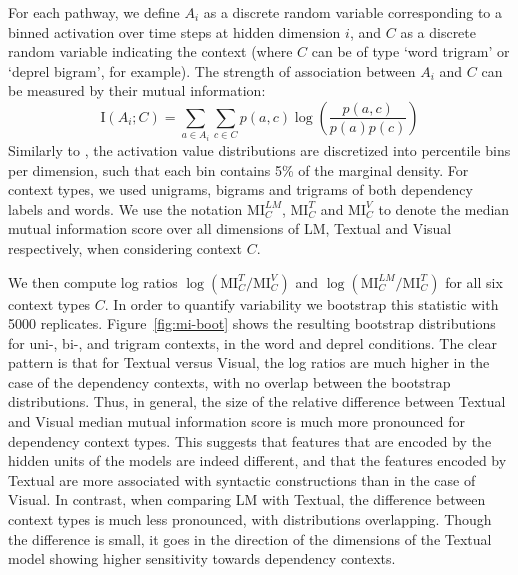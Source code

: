 For each pathway, we define $A_i$ as a discrete random variable corresponding 
to a binned activation over time steps at hidden dimension $i$, and $C$ 
as a discrete random variable indicating the context 
(where $C$ can be of type `word trigram' or `deprel bigram', for example). 
The strength of association between $A_i$ and $C$ can be measured 
by their mutual information:
\[
\mathrm{I}(A_i;C) = \sum_{a\in{A_i}}\sum_{c\in{C}} p(a,c)\log\left(\frac{p(a,c)}{p(a)p(c)}\right) 
\]
Similarly to , the activation value distributions are discretized 
into percentile bins per dimension, such that each bin contains 5\% of the marginal 
density. For context types, we used unigrams, bigrams and trigrams of both dependency labels 
and words. We use the notation $\mathrm{MI}^\mathit{LM}_C$,  $\mathrm{MI}^T_C$ and  $\mathrm{MI}^V_C$ 
to denote the median mutual information score over all dimensions of {\sc LM}, {\sc Textual} and {\sc Visual} 
respectively, when considering context $C$. 


We then compute log ratios $\log(\mathrm{MI}^{T}_{C}/\mathrm{MI}^{V}_{C})$ and $\log(\mathrm{MI}^\mathit{LM}_{C}/\mathrm{MI}^{T}_{C})$
for all six context types $C$. In order to quantify variability we bootstrap this statistic with
5000 replicates. Figure~\ref{fig:mi-boot} shows the resulting bootstrap distributions 
for uni-, bi-, and trigram contexts, in the word and deprel conditions. The clear pattern is 
that for {\sc Textual} versus {\sc Visual}, the log ratios are much higher in the case of the dependency contexts, with no overlap between
the bootstrap distributions. Thus, in general, the size of the
relative difference between {\sc Textual} and {\sc Visual} median
mutual information score is much more pronounced for dependency context types.
This suggests that features that are encoded by the hidden units of
the models are indeed different, and that the features encoded by {\sc Textual} are more 
associated with syntactic constructions than in the case of  {\sc
  Visual}. In contrast, when comparing {\sc LM} with {\sc Textual},
the difference between context types is much less pronounced, with
distributions overlapping. Though the difference is small, it goes in
the direction of the dimensions of the {\sc Textual} model showing
higher sensitivity towards dependency contexts.

